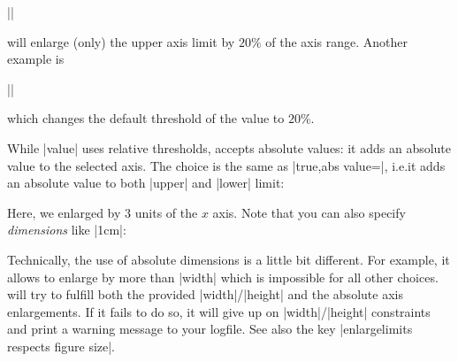 \begin{pgfplotsxykeylist}
        ||

    will enlarge (only) the upper axis limit by $20\%$ of the axis range.
    Another example is

        ||

    which changes the default threshold of the  value to
    $20\%$.
\begin{codeexample}[]
\end{codeexample}

     While |value| uses relative thresholds,  accepts
     absolute values: it adds an absolute value to the selected axis. The
     choice  is the same as
     |true,abs value=|, i.e.\@ it adds an absolute value to both
     |upper| and |lower| limit:
\begin{codeexample}[]
\end{codeexample}
    \noindent Here, we enlarged by $3$ units of the $x$ axis. Note that you can
    also specify \emph{dimensions} like |1cm|:
\begin{codeexample}[]
\end{codeexample}
    \noindent Technically, the use of absolute dimensions is a little bit
    different. For example, it allows to enlarge by more than |width| which is
    impossible for all other choices. \PGFPlots{} will try to fulfill both the
    provided |width|/|height| and the absolute axis enlargements. If it fails
    to do so, it will give up on |width|/|height| constraints and print a
    warning message to your logfile. See also the key
    |enlargelimits respects figure size|.



\end{pgfplotsxykeylist}
